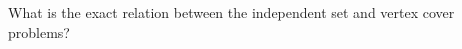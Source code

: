 \begin{Exercise}\label{exr:indset}
What is the exact relation between the independent set and vertex cover problems?
\end{Exercise}

%

